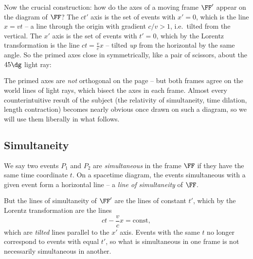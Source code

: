 \documentclass[a4paper]{scrartcl}
\begin{document}
Now the crucial construction: how do the axes of a moving frame $\FF'$ appear on the diagram of $\FF$? The $ct'$ axis is the set of events with $x' = 0$, which is the line $x = vt$ -- a line through the origin with gradient $c/v > 1$, i.e.\ tilted from the vertical. The $x'$ axis is the set of events with $t' = 0$, which by the Lorentz transformation is the line $ct = \frac{v}{c}x$ -- tilted \emph{up} from the horizontal by the same angle. So the primed axes close in symmetrically, like a pair of scissors, about the $45\dg$ light ray:

\begin{center}
\end{center}

The primed axes are \emph{not} orthogonal on the page -- but both frames agree on the world lines of light rays, which bisect the axes in each frame. Almost every counterintuitive result of the subject (the relativity of simultaneity, time dilation, length contraction) becomes nearly obvious once drawn on such a diagram, so we will use them liberally in what follows.

\subsection{Simultaneity}

We say two events $P_1$ and $P_2$ are \emph{simultaneous} in the frame $\FF$ if they have the same time coordinate $t$. On a spacetime diagram, the events simultaneous with a given event form a horizontal line -- a \emph{line of simultaneity} of $\FF$.

But the lines of simultaneity of $\FF'$ are the lines of constant $t'$, which by the Lorentz transformation are the lines
$$
ct - \frac{v}{c}x = \text{const},
$$
which are \emph{tilted} lines parallel to the $x'$ axis. Events with the same $t$ no longer correspond to events with equal $t'$, so what is simultaneous in one frame is not necessarily simultaneous in another.

\begin{center}
\end{center}
\end{document}
